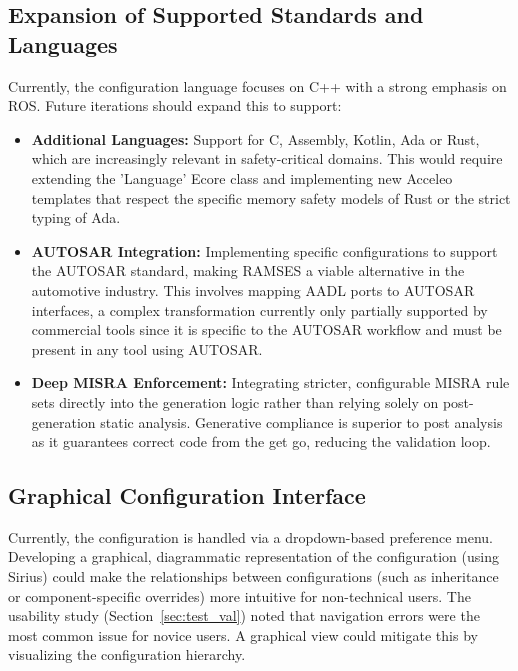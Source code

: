 \subsection{Expansion of Supported Standards and Languages}
\label{sec:concl_language_and_standard_expansion}

Currently, the configuration language focuses on C++ with a strong emphasis on \gls{ROS}. Future iterations should expand this to support:

\begin{itemize} 
	\item \textbf{Additional Languages: } Support for C, Assembly, Kotlin, Ada or Rust, which are increasingly relevant in safety-critical domains. This would require extending the 'Language' Ecore class and implementing new Acceleo templates that respect the specific memory safety models of Rust or the strict typing of Ada.
	
	\item \textbf{\gls{AUTOSAR} Integration: } Implementing specific configurations to support the \gls{AUTOSAR} standard, making \gls{RAMSES} a viable alternative in the automotive industry. This involves mapping \gls{AADL} ports to \gls{AUTOSAR} interfaces, a complex transformation currently only partially supported by commercial tools since it is specific to the \gls{AUTOSAR} workflow and must be present in any tool using \gls{AUTOSAR}.
	
	\item \textbf{Deep \gls{MISRA} Enforcement: } Integrating stricter, configurable \gls{MISRA} rule sets directly into the generation logic rather than relying solely on post-generation static analysis. Generative compliance is superior to post analysis as it guarantees correct code from the get go, reducing the validation loop.
\end{itemize}



\subsection{Graphical Configuration Interface}
\label{sec:concl_g_c_interface}

Currently, the configuration is handled via a dropdown-based preference menu. Developing a graphical, diagrammatic representation of the configuration (using Sirius) could make the relationships between configurations (such as inheritance or component-specific overrides) more intuitive for non-technical users. The usability study (Section~\ref{sec:test_val}) noted that navigation errors were the most common issue for novice users. A graphical view could mitigate this by visualizing the configuration hierarchy.

